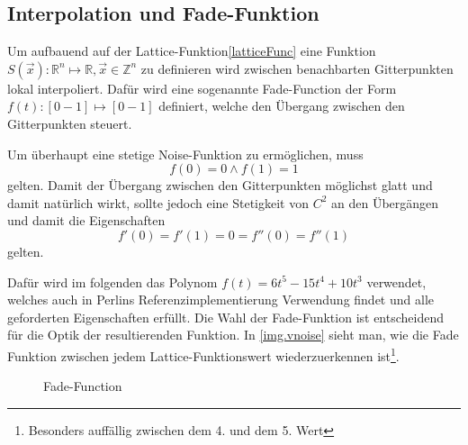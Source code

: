 \subsection{Interpolation und Fade-Funktion}
Um aufbauend auf der Lattice-Funktion\ref{latticeFunc} eine Funktion $S(\vec{x}): \mathbb{R}^n\mapsto\mathbb{R}, \vec{x}\in \mathbb{Z}^n$\label{S} zu definieren wird zwischen benachbarten Gitterpunkten lokal interpoliert. Dafür wird eine sogenannte Fade-Function\cite{fadeFunction} der Form $f(t): \left[0-1\right]\mapsto\left[0-1\right]$ definiert, welche den Übergang zwischen den Gitterpunkten steuert.

Um überhaupt eine stetige Noise-Funktion zu ermöglichen, muss 
\begin{equation}
f(0) = 0 \land f(1) = 1
\end{equation} gelten.
Damit der Übergang zwischen den Gitterpunkten möglichst glatt und damit natürlich wirkt, sollte jedoch eine Stetigkeit von $C^2$ an den Übergängen und damit die Eigenschaften 
\begin{equation}
	f'(0) = f'(1) = 0 = f''(0) = f''(1)
\end{equation} 
gelten.

Dafür wird im folgenden das Polynom $f(t) = 6t^5-15t^4+10t^3$ verwendet, welches auch in Perlins Referenzimplementierung Verwendung findet\cite{BurgerGradientNoise2008} und alle geforderten Eigenschaften erfüllt. Die Wahl der Fade-Funktion ist entscheidend für die Optik der resultierenden Funktion. In \autoref{img.vnoise} sieht man, wie die Fade Funktion zwischen jedem Lattice-Funktionswert wiederzuerkennen ist\footnote{Besonders auffällig zwischen dem 4. und dem 5. Wert}.
\begin{figure}[!hbtp]%
	\centering
	\caption{Fade-Function}
\end{figure}
\newpage
